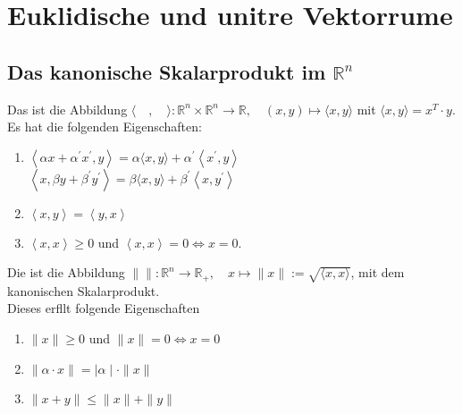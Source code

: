 \documentclass[11pt, a4paper]{article}
\begin{document}
\section{Euklidische und unit\aee re Vektorr\aee ume}

\subsection{Das kanonische Skalarprodukt im $\mathbb{R}^n$}
\begin{definition}
Das  ist die Abbildung $\langle\quad, \quad\rangle: \mathbb{R}^{n} \times \mathbb{R}^{n} \rightarrow \mathbb{R}, \quad(x, y) \mapsto\langle x, y\rangle$ mit $\langle x, y\rangle = x^T \cdot y$.
\\Es hat die folgenden Eigenschaften:
\begin{enumerate}
\item {} $\left\langle \alpha x+ \alpha^{\prime} x^{\prime}, y\right\rangle=\alpha \langle x, y\rangle+ \alpha^{\prime}\left\langle x^{\prime}, y\right\rangle $
\\$\left\langle x, \beta y+ \beta^{\prime} y^{\prime}\right\rangle=\beta \langle x, y\rangle+ \beta^{\prime}\left\langle x, y^{\prime}\right\rangle $
\item {} $\left\langle x, y \right\rangle = \left\langle y, x \right\rangle$
\item {} $\left\langle x, x \right\rangle \geq 0$ und $\left\langle x, x \right\rangle = 0 \Leftrightarrow x = 0$.
\end{enumerate}
\end{definition}

\begin{definition}
Die  ist die Abbildung $\|\|: \mathbb{R}^{n} \rightarrow \mathbb{R}_{+}, \quad x \mapsto\|x\|:=\sqrt{\langle x, x\rangle}$, mit dem kanonischen Skalarprodukt.
\\Dieses erf\uee llt folgende Eigenschaften
\begin{enumerate}
\item $\|x\| \geq 0$ und $\|x\| = 0 \Leftrightarrow x= 0$
\item $ \| \alpha \cdot x \| = \mid\alpha \mid \cdot \|x \| $ 
\item $\|x+y\| \leq\|x\|+\|y\|$
\end{enumerate}
\end{definition}
\end{document}
